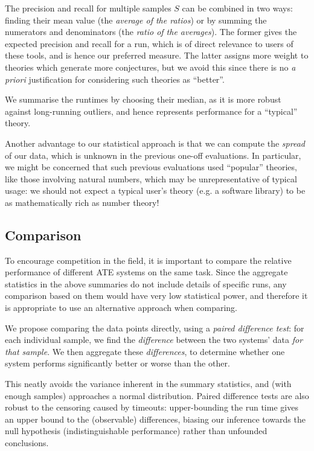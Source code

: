 The precision and recall for multiple samples $S$ can be combined in two ways:
finding their mean value (the \emph{average of the ratios}) or by summing the
numerators and denominators (the \emph{ratio of the averages}). The former gives
the expected precision and recall for a run, which is of direct relevance to
users of these tools, and is hence our preferred measure. The latter assigns
more weight to theories which generate more conjectures, but we avoid this since
there is no \emph{a priori} justification for considering such theories as
``better''.

We summarise the runtimes by choosing their median, as it is more robust against
long-running outliers, and hence represents performance for a ``typical''
theory.

Another advantage to our statistical approach is that we can compute the
\emph{spread} of our data, which is unknown in the previous one-off
evaluations. In particular, we might be concerned that such previous evaluations
used ``popular'' theories, like those involving natural numbers, which may be
unrepresentative of typical usage: we should not expect a typical user's theory
(e.g. a software library) to be as mathematically rich as number theory!

\subsection{Comparison}

To encourage competition in the field, it is important to compare the relative
performance of different ATE systems on the same task. Since the aggregate
statistics in the above summaries do not include details of specific runs, any
comparison based on them would have very low statistical power, and therefore it
is appropriate to use an alternative approach when comparing.

We propose comparing the data points directly, using a \emph{paired difference
  test}: for each individual sample, we find the \emph{difference} between the
two systems' data \emph{for that sample}. We then aggregate these
\emph{differences}, to determine whether one system performs significantly
better or worse than the other.

This neatly avoids the variance inherent in the summary statistics, and (with
enough samples) approaches a normal distribution. Paired difference tests are
also robust to the censoring caused by timeouts: upper-bounding the run time
gives an upper bound to the (observable) differences, biasing our inference
towards the null hypothesis (indistinguishable performance) rather than
unfounded conclusions.

